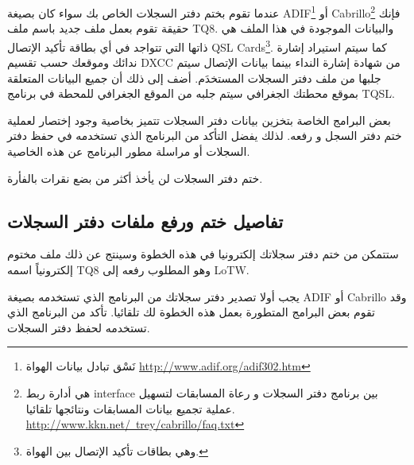 \documentclass[a4paper,12pt]{article}
\begin{document}
عندما تقوم بختم دفتر السجلات الخاص بك سواء كان بصيغة \textenglish{ADIF}\footnote{نَسْق تبادل بيانات الهواة {\href{http://www.adif.org/adif302.htm}{http://www.adif.org/adif302.htm}}} أو \textenglish{Cabrillo}\footnote{هي أدارة ربط \textenglish{interface} بين برنامج دفتر السجلات و رعاة المسابقات لتسهيل عملية تجميع بيانات المسابقات ونتائجها تلقائيا. {\href{http://www.kkn.net/~trey/cabrillo/faq.txt}{http://www.kkn.net/~trey/cabrillo/faq.txt}}}
فإنك حقيقة تقوم بعمل ملف جديد باسم ملف \textenglish{TQ8}. والبيانات الموجودة في هذا
الملف هي ذاتها التي تتواجد في أي بطاقة تأكيد الإتصال \textenglish{QSL Cards}\footnote{وهي بطاقات تأكيد الإتصال بين الهواة.}. كما سيتم
استيراد إشارة ندائك وموقعك حسب تقسيم \textenglish{DXCC} من شهادة إشارة النداء بينما
بيانات الإتصال سيتم جلبها من ملف دفتر السجلات المستخدَم. أضف إلى ذلك أن
جميع البيانات المتعلقة بموقع محطتك الجغرافي سيتم جلبه من الموقع الجغرافي
للمحطة في برنامج \textenglish{TQSL}.

بعض البرامج الخاصة بتخزين بيانات دفتر السجلات تتميز بخاصية وجود إختصار
لعملية ختم دفتر السجل و رفعه. لذلك يفضل التأكد من البرنامج الذي تستخدمه
في حفظ دفتر السجلات أو مراسلة مطور البرنامج عن هذه الخاصية.

ختم دفتر السجلات لن يأخذ أكثر من بضع نقرات بالفأرة.

\vspace{18pt}
\begin{center}
	\color{slategray2}
{\Huge \decoone}
\end{center}

\subsection{تفاصيل ختم ورفع ملفات دفتر السجلات}

ستتمكن من ختم دفتر سجلاتك إلكترونيا في هذه الخطوة وسينتج عن ذلك
ملف مختوم إلكترونياً اسمه \textenglish{TQ8} وهو المطلوب رفعه إلى \textenglish{LoTW}.

يجب أولا تصدير دفتر سجلاتك من البرنامج الذي تستخدمه بصيغة \textenglish{ADIF}
أو \textenglish{Cabrillo} وقد تقوم بعض البرامج المتطورة بعمل هذه الخطوة لك تلقائيا.
تأكد من البرنامج الذي تستخدمه لحفظ دفتر السجلات.
\end{document}
